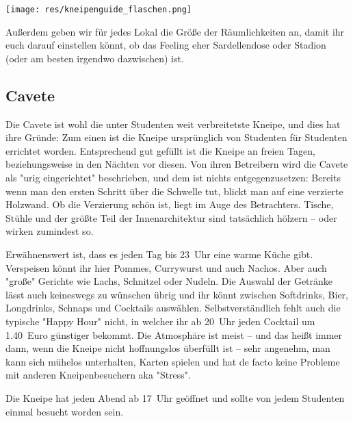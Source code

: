 {\begin{multicols*}{2}
\begin{center}
	\texttt{[image: res/kneipenguide\_flaschen.png]}
\end{center}

Außerdem geben wir für jedes Lokal die Größe der Räumlichkeiten an, damit ihr euch darauf einstellen könnt, ob das Feeling eher Sardellendose oder Stadion (oder am besten irgendwo dazwischen) ist.

\subsection{Cavete}
Die Cavete ist wohl die unter Studenten weit verbreitetste Kneipe, und dies hat ihre Gründe: Zum einen ist die Kneipe ursprünglich von Studenten für Studenten errichtet worden.
Entsprechend gut gefüllt ist die Kneipe an freien Tagen, beziehungsweise in den Nächten vor diesen.
Von ihren Betreibern wird die Cavete als "urig eingerichtet" beschrieben, und dem ist nichts entgegenzusetzen:
Bereits wenn man den ersten Schritt über die Schwelle tut, blickt man auf eine verzierte Holzwand.
Ob die Verzierung schön ist, liegt im Auge des Betrachters.
Tische, Stühle und der größte Teil der Innenarchitektur sind tatsächlich hölzern -- oder wirken zumindest so.

Erwähnenswert ist, dass es jeden Tag bis 23~Uhr eine warme Küche gibt.
Verspeisen könnt ihr hier Pommes, Currywurst und auch Nachos.
Aber auch "große" Gerichte wie Lachs, Schnitzel oder Nudeln.
Die Auswahl der Getränke lässt auch keineswegs zu wünschen übrig und ihr könnt zwischen Softdrinks, Bier, Longdrinks, Schnaps und Cocktails auswählen.
Selbstverständlich fehlt auch die typische "Happy Hour" nicht, in welcher ihr ab 20~Uhr jeden Cocktail um \num{1,40}~Euro günstiger bekommt.
Die Atmosphäre ist meist -- und das heißt immer dann, wenn die Kneipe nicht hoffnungslos überfüllt ist -- sehr angenehm, man kann sich mühelos unterhalten, Karten spielen und hat de facto keine Probleme mit anderen Kneipenbesuchern aka "Stress".

Die Kneipe hat jeden Abend ab 17~Uhr geöffnet und sollte von jedem Studenten
einmal besucht worden sein.

\begin{center}
\end{center}


\end{multicols*}}
